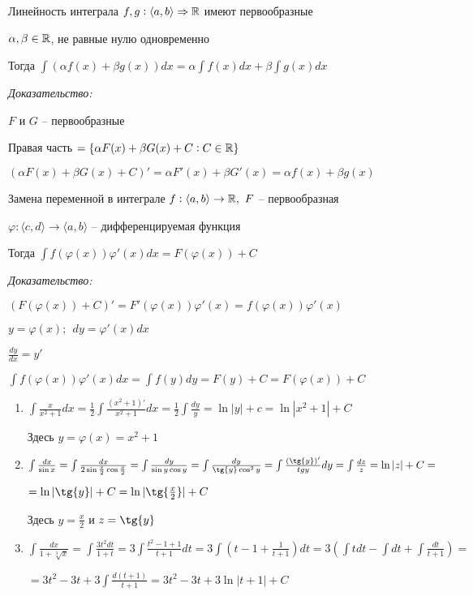 \documentclass[12pt]{article}
\newcommand{\q}[1]{\langle #1 \rangle}
\begin{document}
\begin{theo}{Линейность интеграла}
    $f, g : \q{a, b} \Rightarrow \R$ имеют первообразные

    $\alpha, \beta \in \mathbb R$, не равные нулю одновременно

    Тогда $\int (\alpha f(x) + \beta g(x))dx = \alpha \int f(x)dx + \beta \int g(x)dx$
\end{theo}

\textit{Доказательство:}

$F$ и $G$ -- первообразные

Правая часть $= \{ \alpha F(x) + \beta G(x) + C : C \in \mathbb R \}$

$(\alpha F(x) + \beta G(x) + C)' = \alpha F'(x) + \beta G'(x) = \alpha f(x) + \beta g(x)$

\begin{theo}{Замена переменной в интеграле}
    $f : \q{a, b} \rightarrow \R,\ F$ -- первообразная
    
    $\varphi : \q{c, d} \rightarrow \q{a, b}$ -- дифференцируемая функция

    Тогда $\int f(\varphi(x))\varphi'(x)dx = F(\varphi(x)) + C$
\end{theo}

\textit{Доказательство:}

$(F(\varphi(x)) + C)' = F'(\varphi(x))\varphi'(x) = f(\varphi(x))\varphi'(x)$

\begin{Remark}{}
    $y = \varphi(x);\ \ dy = \varphi'(x)dx$

    $\frac{dy}{dx} = y'$

    $\int f(\varphi(x)) \varphi'(x)dx = \int f(y)dy = F(y) + C = F(\varphi(x)) + C$
\end{Remark}

\begin{Example}{}
    \begin{enumerate}
        \item $\int \frac{x}{x^2 + 1}dx = \frac{1}{2} \int \frac{(x^2 + 1)'}{x^2 + 1}dx = \frac{1}{2} \int \frac{dy}{y} = \ln{|y|} + c = \ln{|x^2 + 1|} + C$
        
        Здесь $y = \varphi(x) = x^2 + 1$

        \item $\int \frac{dx}{\sin{x}} = \int \frac{dx}{2\sin{\frac{x}{2}}\cos{\frac{x}{2}}} = \int \frac{dy}{\sin{y}\cos{y}} = \int \frac{dy}{\tg{y}\cos^2{y}} = \int \frac{(\tg{y})'}{tg{y}}dy = \int \frac{dz}{z} = \ln{|z|} + C =$
        
        $= \ln{|\tg{y}|} + C = \ln{|\tg{\frac{x}{2}}|} + C$

        Здесь $y = \frac{x}{2}$ и $z = \tg{y}$

        \item $\int \frac{dx}{1 + \sqrt[3]{x}} = \int \frac{3t^2dt}{1 + t} = 3\int \frac{t^2 - 1 + 1}{t + 1}dt = 3\int (t - 1 + \frac{1}{t + 1})dt = 3(\int tdt - \int dt + \int \frac{dt}{t + 1}) =$
        
        $= 3t^2 - 3t + 3\int \frac{d(t + 1)}{t + 1} = 3t^2 - 3t + 3\ln{|t + 1|} + C$
    \end{enumerate}
\end{Example}
\end{document}
